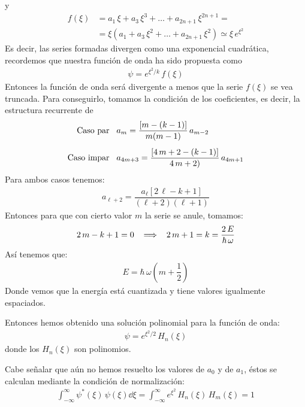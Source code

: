 y
\begin{align*}
f(\xi) &= a_{1} \, \xi + a_{3} \, \xi^{3} + \ldots + a_{2n+1} \, \xi^{2n+1} = \\[0.5em]
&= \xi \left( a_{1} + a_{3} \, \xi^{2} + \ldots + a_{2n+1} \, \xi^{2} \right) \simeq \xi \, e^{\xi^{2}}
\end{align*}
Es decir, las series formadas divergen como una exponencial cuadrática, recordemos que nuestra función de onda ha sido propuesta como
\begin{align*}
\psi = e^{\xi^{2}/k} \, f(\xi)
\end{align*}
Entonces la función de onda será divergente a menos que la serie $f(\xi)$ se vea truncada. Para conseguirlo, tomamos la condición de los coeficientes, es decir, la estructura recurrente de
\begin{align*}
\text{Caso par} \hspace{0.3cm} &a_{m} = \dfrac{[m - (k - 1)]}{m(m - 1)} \, a_{m-2} \\[0.5em]
\text{Caso impar} \hspace{0.3cm} &a_{4m+3} = \dfrac{[4 \, m + 2 - (k - 1)]}{4 \, m + 2)} \, a_{4m+1}
\end{align*}
Para ambos casos tenemos:
\begin{align*}
a_{\ell + 2} = \dfrac{a_\ell [2 \, \ell - k + 1]}{(\ell + 2)(\ell + 1)}
\end{align*}
Entonces para que con cierto valor $m$ la serie se anule, tomamos:
\begin{align*}
2 \, m - k + 1 = 0 \hspace{0.3cm} \Longrightarrow \hspace{0.3cm} 2 \, m + 1 = k = \dfrac{2 \, E}{\hbar \, \omega}
\end{align*}
Así tenemos que:
\begin{align*}
E = \hbar \, \omega \left( m + \dfrac{1}{2} \right)
\end{align*}
Donde vemos que la energía está cuantizada y tiene valores igualmente espaciados.
\par
Entonces hemos obtenido una solución polinomial para la función de onda:
\begin{align*}
\psi = e^{\xi^{2}/2} \, H_{n} (\xi)
\end{align*}
donde los $H_{n} (\xi)$ son polinomios.
\par
Cabe señalar que aún no hemos resuelto los valores de $a_{0}$ y de $a_{1}$, éstos se calculan mediante la condición de normalización:
\begin{align*}
\int_{-\infty}^{\infty} \psi^{*} (\xi) \, \psi(\xi) \dd{\xi} = \int_{-\infty}^{\infty} e^{\xi^{2}} \, H_{n} (\xi) \, H_{m} (\xi) =  1
\end{align*}
